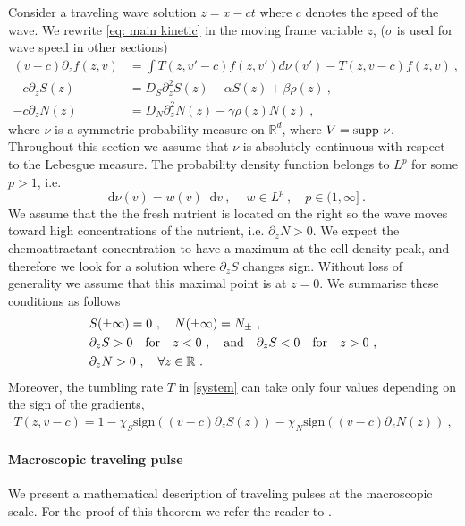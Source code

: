\documentclass[11pt,twoside]{article}
\numberwithin{equation}{section}
\newcommand*\diff{\mathop{}\!\mathrm{d}}
\theoremstyle{plain}
\theoremstyle{nonumberplain}
\begin{document}
{Consider a traveling wave solution $z=x-ct$ where $c$ denotes the speed of the wave. We rewrite \eqref{eq: main kinetic} in the moving frame variable $z$, {\color{red} ($\sigma$ is used for wave speed in other sections)}
\begin{equation}
\begin{aligned}\label{system}
(v-c)\partial_zf(z,v)&=\int T(z,v'-c)f(z,v')d\nu(v')-T(z,v-c)f(z,v)\ ,\\
-c\partial_z S(z)&=D_S\partial_{z}^2S(z)-\alpha S(z)+\beta \rho(z)\ ,\\
-c\partial_zN(z)&=D_N\partial_{z}^2N(z)-\gamma\rho(z) N(z)
\ ,
\end{aligned}
\end{equation}
where $\nu$ is a symmetric probability measure on $\mathbb{R}^d$, where $V=\textnormal{supp}\ \nu$. Throughout this section we assume that $\nu$ is absolutely continuous with respect to the Lebesgue measure. The probability density function belongs to $L^p$ for some $p > 1$, i.e.
\[
\diff \nu (v)=w(v)\diff v\ ,\ \quad w\in L^p\ , \quad p\in(1,\infty]\ .
\]
We assume that the the fresh nutrient is located on the right so the wave moves toward high concentrations of the nutrient, i.e.  $\partial_zN>0$. We expect the chemoattractant concentration to have a maximum at the cell density peak, and therefore we look for a solution where  $\partial_zS$ changes sign. Without loss of generality we assume that this maximal point is at $z=0$.  We summarise these conditions as follows
\begin{equation}
\begin{aligned}
 &S(\pm \infty)=0\ ,\quad N(\pm\infty)=N_\pm\ ,\\
&\partial_z S>0  \quad  \textrm{for}\quad z<0\ , \quad\textnormal{and}\quad\partial_z S<0 \quad \textrm{for}\quad z>0\ ,\\
&\partial_zN>0\ ,\quad\forall z\in\mathbb{R}\ .\label{eq: cond chemicals}
\end{aligned}
\end{equation}
Moreover, the tumbling rate $T$ in \eqref{system} can take only four values depending on the sign of the gradients,
\begin{eqnarray}\label{tumbl}
   T(z,v-c)=1-\chi_S \textrm{sign}((v-c)\partial_z S(z))-\chi_N \textrm{sign}((v-c)\partial_z N(z))\ ,
\end{eqnarray}

\paragraph{Macroscopic traveling pulse}
We present a mathematical description of traveling pulses at the macroscopic scale. For the proof of this theorem we refer the reader to \cite{calvez2019chemotactic}.

}
\end{document}

